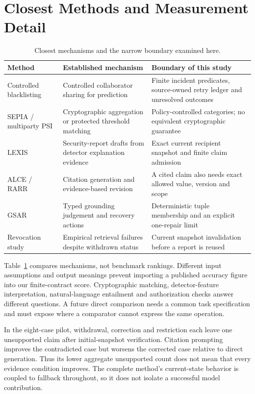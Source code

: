 \documentclass[conference,letterpaper]{IEEEtran}
\begin{document}
\section{Closest Methods and Measurement Detail}
\begin{table}[t]
\centering\caption{Closest mechanisms and the narrow boundary examined here.}
\label{tab:closest}\footnotesize
\begin{tabular}{p{}p{}p{}}\hline
Method & Established mechanism & Boundary of this study\\\hline
Controlled blacklisting~\cite{freudiger} & Controlled collaborator sharing for prediction & Finite incident predicates, source-owned retry ledger and unresolved outcomes\\
SEPIA / multiparty PSI~\cite{sepia,psi} & Cryptographic aggregation or protected threshold matching & Policy-controlled categories; no equivalent cryptographic guarantee\\
LEXIS~\cite{lexis} & Security-report drafts from detector explanation evidence & Exact current recipient snapshot and finite claim admission\\
ALCE / RARR~\cite{alce,rarr} & Citation generation and evidence-based revision & A cited claim also needs exact allowed value, version and scope\\
GSAR~\cite{gsar} & Typed grounding judgement and recovery actions & Deterministic tuple membership and an explicit one-repair limit\\
Revocation study~\cite{revocation} & Empirical retrieval failures despite withdrawn status & Current snapshot invalidation before a report is reused\\\hline
\end{tabular}
\end{table}

Table~\ref{tab:closest} compares mechanisms, not benchmark rankings. Different input assumptions and output meanings prevent importing a published accuracy figure into our finite-contract score. Cryptographic matching, detector-feature interpretation, natural-language entailment and authorization checks answer different questions. A future direct comparison needs a common task specification and must expose where a comparator cannot express the same operation.

In the eight-case pilot, withdrawal, correction and restriction each leave one unsupported claim after initial-snapshot verification. Citation prompting improves the contradicted case but worsens the corrected case relative to direct generation. Thus its lower aggregate unsupported count does not mean that every evidence condition improves. The complete method's current-state behavior is coupled to fallback throughout, so it does not isolate a successful model contribution.
\end{document}
